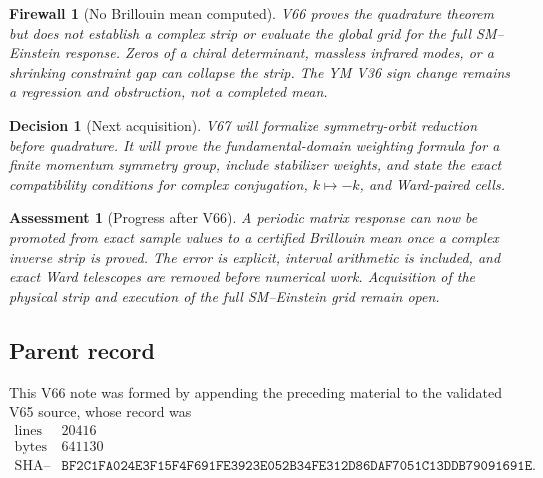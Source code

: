 \documentclass[11pt]{article}
\newtheorem{assessment}[theorem]{Assessment}
\newtheorem{firewall}[theorem]{Firewall}
\newtheorem{decision}[theorem]{Decision}
\begin{document}
\begin{firewall}[No Brillouin mean computed]
\label{fire:v11v66-boundary}
V66 proves the quadrature theorem but does not establish a complex
strip or evaluate the global grid for the full SM--Einstein response.
Zeros of a chiral determinant, massless infrared modes, or a shrinking
constraint gap can collapse the strip.  The YM V36 sign change remains
a regression and obstruction, not a completed mean.
\end{firewall}

\begin{decision}[Next acquisition]
\label{dec:v11v66-next}
V67 will formalize symmetry-orbit reduction before quadrature.  It will
prove the fundamental-domain weighting formula for a finite momentum
symmetry group, include stabilizer weights, and state the exact
compatibility conditions for complex conjugation, \(k\mapsto-k\), and
Ward-paired cells.
\end{decision}

\begin{assessment}[Progress after V66]
\label{ass:v11v66-status}
A periodic matrix response can now be promoted from exact sample values
to a certified Brillouin mean once a complex inverse strip is proved.
The error is explicit, interval arithmetic is included, and exact Ward
telescopes are removed before numerical work.  Acquisition of the
physical strip and execution of the full SM--Einstein grid remain open.
\end{assessment}

\subsection{Parent record}

This V66 note was formed by appending the preceding material to the
validated V65 source, whose record was
\[
\begin{array}{c|c}
\text{lines}&20416\\
\text{bytes}&641130\\
\text{SHA--256}&
\texttt{BF2C1FA024E3F15F4F691FE3923E052B34FE312D86DAF7051C13DDB79091691E}.
\end{array}                                                     \tag{66.23}
\]

\end{document}
